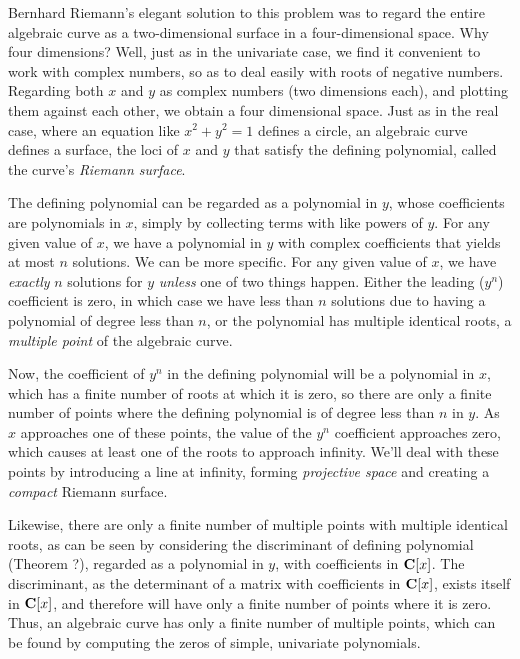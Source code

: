 Bernhard Riemann's elegant solution to this problem was to regard the
entire algebraic curve as a two-dimensional surface in a
four-dimensional space.  Why four dimensions?  Well, just as in the
univariate case, we find it convenient to work with complex numbers,
so as to deal easily with roots of negative numbers.  Regarding both
$x$ and $y$ as complex numbers (two dimensions each), and plotting
them against each other, we obtain a four dimensional space.  Just as
in the real case, where an equation like $x^2 + y^2 = 1$ defines a
circle, an algebraic curve defines a surface, the loci of $x$ and $y$
that satisfy the defining polynomial, called the curve's {\it Riemann
surface}.


The defining polynomial can be regarded as a polynomial in $y$, whose
coefficients are polynomials in $x$, simply by collecting terms with
like powers of $y$.  For any given value of $x$, we have a polynomial
in $y$ with complex coefficients that yields at most $n$ solutions.
We can be more specific.  For any given value of $x$, we have {\it
exactly} $n$ solutions for $y$ {\it unless} one of two things happen.
Either the leading ($y^n$) coefficient is zero, in which case we have
less than $n$ solutions due to having a polynomial of degree less than
$n$, or the polynomial has multiple identical roots, a {\it multiple
point} of the algebraic curve.

Now, the coefficient of $y^n$ in the defining polynomial will be a
polynomial in $x$, which has a finite number of roots at which it is
zero, so there are only a finite number of points where the defining
polynomial is of degree less than $n$ in $y$.  As $x$ approaches one
of these points, the value of the $y^n$ coefficient approaches zero,
which causes at least one of the roots to approach infinity.  We'll
deal with these points by introducing a line at infinity, forming
{\it projective space} and creating a {\it compact} Riemann surface.

Likewise, there are only a finite number of multiple points with
multiple identical roots, as can be seen by considering the
discriminant of defining polynomial (Theorem ?), regarded as a
polynomial in $y$, with coefficients in ${\bf C}[x]$.  The
discriminant, as the determinant of a matrix with coefficients in
${\bf C}[x]$, exists itself in ${\bf C}[x]$, and therefore will have
only a finite number of points where it is zero.  Thus, an algebraic
curve has only a finite number of multiple points, which can be found
by computing the zeros of simple, univariate polynomials.

